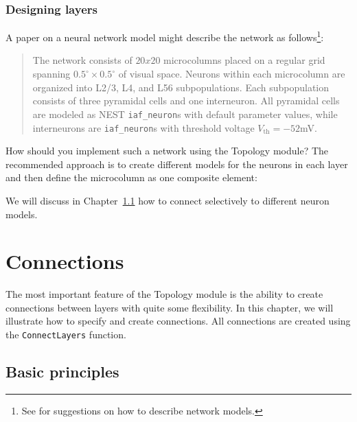 \documentclass[a4paper,12pt]{report}
\begin{document}
\subsection{Designing layers}\label{sec:layerdesign}

A paper on a neural network model might describe the network as
follows\footnote{See \citet{Nord:2009(456)} for suggestions on how to
  describe network models.}:
\begin{quote}
The network consists of $20x20$ microcolumns placed on a regular grid
spanning $0.5^\circ\times 0.5^\circ$ of visual space. Neurons within each
microcolumn are organized into L2/3, L4, and L56
subpopulations. Each subpopulation consists of three pyramidal cells
and one interneuron. All pyramidal cells are modeled as NEST
\lstinline!iaf_neuron!s with default parameter values, while
interneurons are \lstinline!iaf_neuron!s with threshold voltage
$V_{\text{th}}=-52$mV. 
\end{quote}
How should you implement such a network using the Topology module?
The recommended approach is to create different models for the
neurons in each layer and then define the microcolumn as one
composite element:
%

%
We will discuss in Chapter~\ref{sec:conn_basics} how to connect
selectively to different neuron models.


\chapter{Connections}\label{sec:connections}

The most important feature of the Topology module is the ability to
create connections between layers with quite some
flexibility. In this chapter, we will illustrate how to specify and
create connections. All connections are created using the
\lstinline!ConnectLayers! function.


\section{Basic principles}\label{sec:conn_basics}
\end{document}

